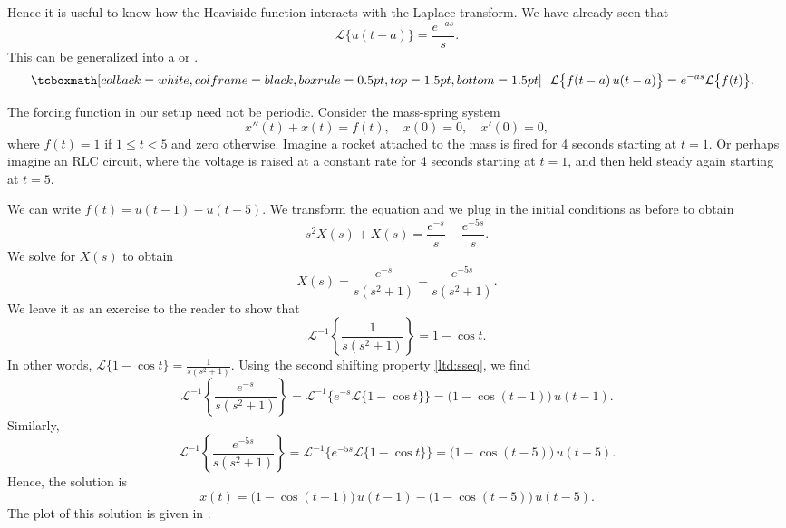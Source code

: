 Hence it is 
useful to know how the Heaviside function interacts with the Laplace
transform.  We have already seen that
\begin{equation*}
\mathcal{L} \bigl\{ u(t-a) \bigr\} = \frac{e^{-as}}{s} .
\end{equation*}
This can be generalized into a \emph{}
or \emph{}.
\begin{equation} \label{ltd:sseq}
\mybxbg{~~
\mathcal{L} \bigl\{ f(t-a) \, u(t-a) \bigr\}
= e^{-as} \mathcal{L} \bigl\{ f(t) \bigr\} .
~~}
\end{equation}

\begin{example} \label{lt:rocketex}
The forcing function in our setup need not be periodic.
Consider
the mass-spring system
\begin{equation*}
x''(t) + x(t) = f(t) , \quad x(0) = 0, \quad x'(0) = 0,
\end{equation*}
where $f(t) = 1$ if $1 \leq t < 5$ and zero otherwise.  Imagine a
rocket attached to the mass is fired for 4 seconds starting at
$t=1$.  Or perhaps imagine an RLC circuit, where the voltage is raised
at a constant rate for 4 seconds starting at $t=1$, and then held steady 
again
starting at $t=5$.

We can
write $f(t) = u(t-1) - u(t-5)$.  We transform the equation and we plug in
the initial conditions as before to obtain
\begin{equation*}
s^2 X(s) + X(s) = \frac{e^{-s}}{s} - \frac{e^{-5s}}{s} .
\end{equation*}
We solve for $X(s)$ to obtain
\begin{equation*}
X(s) = \frac{e^{-s}}{s(s^2+1)} - \frac{e^{-5s}}{s(s^2+1)} .
\end{equation*}
We leave it as an exercise to the reader to show that
\begin{equation*}
{\mathcal{L}}^{-1} \left\{ \frac{1}{s(s^2+1)} \right\}
= 1 - \cos t .
\end{equation*}
In other words,
$\mathcal{L} \{ 1 - \cos t  \} = 
\frac{1}{s(s^2+1)}$.
Using the second shifting property \eqref{ltd:sseq}, we find
\begin{equation*}
{\mathcal{L}}^{-1} \left\{ \frac{e^{-s}}{s(s^2+1)} \right\}
=
{\mathcal{L}}^{-1} \bigl\{
e^{-s}
\mathcal{L} \{ 1 - \cos t \}
\bigr\}
=
\bigl( 1 - \cos (t-1) \bigr) \, u(t-1) .
\end{equation*}
Similarly,
\begin{equation*}
{\mathcal{L}}^{-1} \left\{ \frac{e^{-5s}}{s(s^2+1)} \right\}
=
{\mathcal{L}}^{-1} \bigl\{
e^{-5s}
\mathcal{L} \{ 1 - \cos t \}
\bigr\}
=
\bigl( 1 - \cos (t-5) \bigr) \, u(t-5) .
\end{equation*}
Hence, the solution is
\begin{equation*}
x(t) = 
\bigl( 1 - \cos (t-1) \bigr) \, u(t-1) -
\bigl( 1 - \cos (t-5) \bigr) \, u(t-5) .
\end{equation*}
The plot of this solution is given in .


\end{example}
